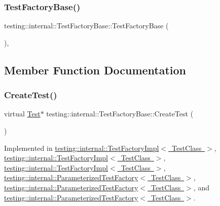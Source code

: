 \subsubsection{\texorpdfstring{TestFactoryBase()}{TestFactoryBase()}\hspace{0.1cm}{\footnotesize\ttfamily [3/3]}}
{\footnotesize\ttfamily testing\+::internal\+::\+Test\+Factory\+Base\+::\+Test\+Factory\+Base (\begin{DoxyParamCaption}{ }\end{DoxyParamCaption})\hspace{0.3cm}{\ttfamily [inline]}, {\ttfamily [protected]}}



\subsection{Member Function Documentation}
\mbox{\label{classtesting_1_1internal_1_1_test_factory_base_a07ac3ca0b196cdb092da0bb186b7c030}} 
\subsubsection{\texorpdfstring{CreateTest()}{CreateTest()}\hspace{0.1cm}{\footnotesize\ttfamily [1/3]}}
{\footnotesize\ttfamily virtual \mbox{\hyperlink{classtesting_1_1_test}{Test}}$\ast$ testing\+::internal\+::\+Test\+Factory\+Base\+::\+Create\+Test (\begin{DoxyParamCaption}{ }\end{DoxyParamCaption})\hspace{0.3cm}{\ttfamily [pure virtual]}}



Implemented in \mbox{\hyperlink{classtesting_1_1internal_1_1_test_factory_impl_a8860c89bdb06450a5d5e8137ebd9d775}{testing\+::internal\+::\+Test\+Factory\+Impl$<$ Test\+Class $>$}}, \mbox{\hyperlink{classtesting_1_1internal_1_1_test_factory_impl_ab9b9236ef39b14f0a78e611748e970e3}{testing\+::internal\+::\+Test\+Factory\+Impl$<$ Test\+Class $>$}}, \mbox{\hyperlink{classtesting_1_1internal_1_1_test_factory_impl_ab9b9236ef39b14f0a78e611748e970e3}{testing\+::internal\+::\+Test\+Factory\+Impl$<$ Test\+Class $>$}}, \mbox{\hyperlink{classtesting_1_1internal_1_1_parameterized_test_factory_ae17e73e91f7fd5d49ca238c005ef4960}{testing\+::internal\+::\+Parameterized\+Test\+Factory$<$ Test\+Class $>$}}, \mbox{\hyperlink{classtesting_1_1internal_1_1_parameterized_test_factory_a36d962674d7bf845398637338b9f75cb}{testing\+::internal\+::\+Parameterized\+Test\+Factory$<$ Test\+Class $>$}}, and \mbox{\hyperlink{classtesting_1_1internal_1_1_parameterized_test_factory_a36d962674d7bf845398637338b9f75cb}{testing\+::internal\+::\+Parameterized\+Test\+Factory$<$ Test\+Class $>$}}.

